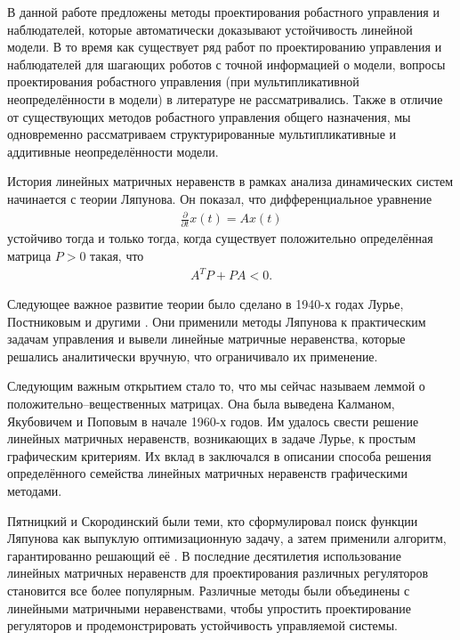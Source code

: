 В данной работе предложены методы проектирования робастного управления и наблюдателей, которые автоматически доказывают устойчивость линейной модели. В то время как существует ряд работ по проектированию управления и наблюдателей для шагающих роботов с точной информацией о модели, вопросы проектирования робастного управления (при мультипликативной неопределённости в модели) в литературе не рассматривались. Также в отличие от существующих методов робастного управления общего назначения, мы одновременно рассматриваем структурированные мультипликативные и аддитивные неопределённости модели.

{\progress}

История линейных матричных неравенств в рамках анализа динамических систем начинается с теории Ляпунова. Он показал, что дифференциальное уравнение
\begin{align*}
	\frac{\partial}{\partial t}x(t)=Ax(t)
\end{align*}
устойчиво тогда и только тогда, когда существует положительно определённая матрица $P > 0$ такая, что
\begin{align*}
	A^T P + P A < 0.
\end{align*}

Следующее важное развитие теории было сделано в 1940-х годах Лурье, Постниковым и другими \cite{LMI1}. 
Они применили методы Ляпунова к практическим задачам управления и вывели линейные матричные неравенства, которые решались аналитически вручную, что ограничивало их применение. 

Следующим важным открытием стало то, что мы сейчас называем леммой о положительно--вещественных матрицах. Она была выведена Калманом, Якубовичем и Поповым в начале 1960-х годов. Им удалось свести решение линейных матричных неравенств, возникающих в задаче Лурье, к простым графическим критериям. Их вклад в \cite{LMI2} заключался в описании способа решения определённого семейства линейных матричных неравенств графическими методами.

Пятницкий и Скородинский были теми, кто сформулировал поиск функции Ляпунова как выпуклую оптимизационную задачу, а затем применили алгоритм, гарантированно решающий её \cite{LMI3}.
В последние десятилетия использование линейных матричных неравенств для проектирования различных регуляторов становится все более популярным. Различные методы \cite{LMI4, LMI5} были объединены с линейными матричными неравенствами, чтобы упростить проектирование регуляторов и продемонстрировать устойчивость управляемой системы.

